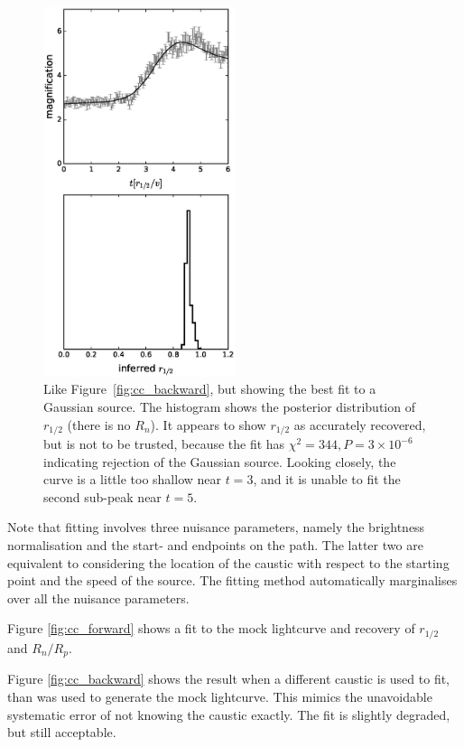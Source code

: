 \documentclass[usenatbib]{mn2e}
\begin{document}
\begin{figure}
\centering
  \includegraphics[width=0.5\textwidth]{figures/gc_forward.eps}
\caption{\label{fig:gc_forward} Like Figure~\ref{fig:cc_backward}, but
  showing the best fit to a Gaussian source.  The histogram shows the
  posterior distribution of $r_{1/2}$ (there is no $R_n$).  It appears
  to show $r_{1/2}$ as accurately recovered, but is not to be trusted,
  because the fit has $\chi^2=344, P=3\times10^{-6}$ indicating
  rejection of the Gaussian source.  Looking closely, the curve is a
  little too shallow near $t=3$, and it is unable to fit the second
  sub-peak near $t=5$.}
\end{figure}

Note that fitting involves three nuisance parameters, namely the
brightness normalisation and the start- and endpoints on the path.
The latter two are equivalent to considering the location of the
caustic with respect to the starting point and the speed of the
source.  The fitting method automatically marginalises over all the
nuisance parameters.

Figure \ref{fig:cc_forward} shows a fit to the mock lightcurve and
recovery of $r_{1/2}$ and $R_n/R_p$.

Figure \ref{fig:cc_backward} shows the result when a different caustic
is used to fit, than was used to generate the mock lightcurve.  This
mimics the unavoidable systematic error of not knowing the caustic
exactly.  The fit is slightly degraded, but still acceptable.
\end{document}
